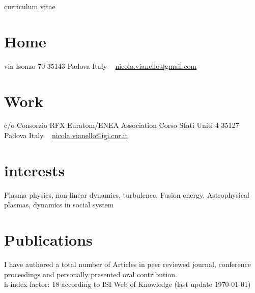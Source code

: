 \documentclass[]{nicola-cv}
\begin{document}
       {curriculum vitae}


\begin{aside}
  \section{Home}
    via Isonzo 70
    35143 Padova
    Italy
    ~
    \href{mailto:nicola.vianello@gmail.com}{nicola.vianello@gmail.com}
  \section{Work}
    c/o Consorzio RFX
    Euratom/ENEA Association
    Corso Stati Uniti 4
    35127 Padova
    Italy
    ~
    \href{mailto:nicola.vianello@igi.cnr.it}{nicola.vianello@igi.cnr.it}
\end{aside}

\section{interests}

Plasma physics, non-linear dynamics, turbulence, Fusion energy,
Astrophysical plasmas, dynamics in social system



























\section{Publications}
\nocite{*}
I have authored a total number of \printbibliography[env=counter,
 heading=counter, type=article] Articles in peer reviewed journal,  
 \printbibliography[env=counter, heading=counter, type=inproceedings]
 conference proceedings and personally presented
 \printbibliography[env=counter, heading=counter, type=misc] oral
 contribution. \\
h-index factor: 18 according to ISI Web of Knowledge (last update \today)
\end{document}
